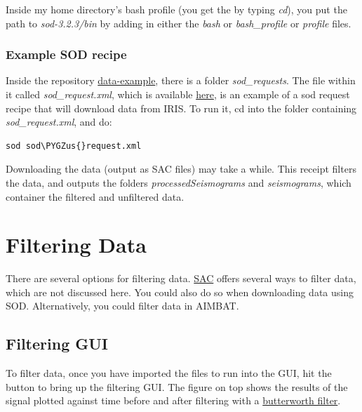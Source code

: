 \documentclass[letterpaper,10pt,english]{sphinxmanual}
\def\PYGZus{\char`\_}
\begin{document}
Inside my home directory's bash profile (you get the by typing \emph{cd}), you put the path to \emph{sod-3.2.3/bin} by adding in either the \emph{bash} or \emph{bash\_profile} or \emph{profile} files.


\subsection{Example SOD recipe}
\label{docfiles/gettingData:example-sod-recipe}
Inside the repository \href{https://github.com/pysmo/data-example}{data-example}, there is a folder \emph{sod\_requests}. The file within it called \emph{sod\_request.xml}, which is available \href{https://github.com/pysmo/data-example/blob/master/sod\_requests/sod\_request.xml}{here}, is an example of a sod request recipe that will download data from IRIS. To run it, cd into the folder containing \emph{sod\_request.xml}, and do:

\begin{Verbatim}[commandchars=\\\{\}]
sod sod\PYGZus{}request.xml
\end{Verbatim}

Downloading the data (output as SAC files) may take a while. This receipt filters the data, and outputs the folders \emph{processedSeismograms} and \emph{seismograms}, which container the filtered and unfiltered data.


\chapter{Filtering Data}
\label{docfiles/filteringData::doc}\label{docfiles/filteringData:filtering-data}
There are several options for filtering data. \href{http://www.iris.edu/files/sac-manual/}{SAC} offers several ways to filter data, which are not discussed here. You could also do so when downloading data using SOD. Alternatively, you could filter data in AIMBAT.


\section{Filtering GUI}
\label{docfiles/filteringData:filtering-gui}
To filter data, once you have imported the files to run into the GUI, hit the  button to bring up the filtering GUI. The figure on top shows the results of the signal plotted against time before and after filtering with a \href{http://en.wikipedia.org/wiki/Butterworth\_filter}{butterworth filter}.
\end{document}
